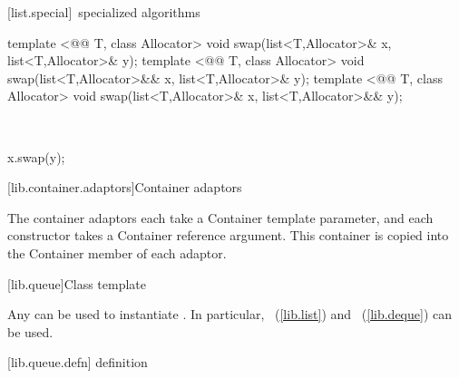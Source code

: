 \documentclass[american,twoside]{book}
\begin{document}
[list.special]{\ specialized algorithms}

\begin{itemdecl}
template <@@ T, class Allocator>
  void swap(list<T,Allocator>& x, list<T,Allocator>& y);
template <@@ T, class Allocator>
  void swap(list<T,Allocator>&& x, list<T,Allocator>& y);
template <@@ T, class Allocator>
  void swap(list<T,Allocator>& x, list<T,Allocator>&& y);
\end{itemdecl}

\begin{itemdescr}
\pnum
\effects\ 
\begin{codeblock}
x.swap(y);
\end{codeblock}
\end{itemdescr}

[lib.container.adaptors]{Container adaptors}

\pnum
The container adaptors each take a Container template parameter,
and each constructor takes a Container reference argument.
This
container is copied into the Container member of each adaptor.

[lib.queue]{Class template }

\pnum
{}%
Any 
can be used to instantiate
.
In particular,
\
(\ref{lib.list})
and
\
(\ref{lib.deque})
can be used.

[lib.queue.defn]{ definition}
\end{document}
